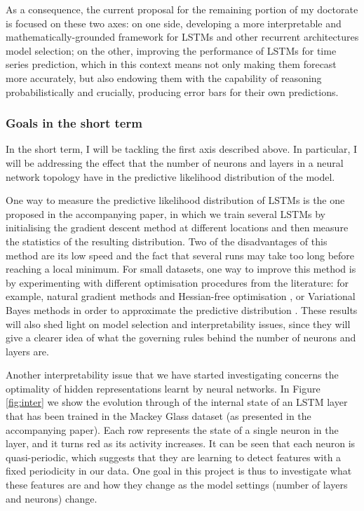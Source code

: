 \documentclass[pdftex,12pt,a4paper]{article}
\theoremstyle{definition}
\theoremstyle{remark}
\begin{document}
\par As a consequence, the current proposal for the remaining portion of my doctorate is focused on these two axes: on one side, developing a more interpretable and mathematically-grounded framework for LSTMs and other recurrent architectures model selection; on the other, improving the performance of LSTMs for time series prediction, which in this context means not only making them forecast more accurately, but also endowing them with the capability of reasoning probabilistically and crucially, producing error bars for their own predictions. 

\subsubsection{Goals in the short term}
In the short term, I will be tackling the first axis described above. In particular, I will be addressing the effect that the number of neurons and layers in a neural network topology have in the predictive likelihood distribution of the model. 

\par One way to measure the predictive likelihood distribution of LSTMs is the one proposed in the accompanying paper, in which we train several LSTMs by initialising the gradient descent method at different locations and then measure the statistics of the resulting distribution. Two of the disadvantages of this method are its low speed and the fact that several runs may take too long before reaching a local minimum. For small datasets, one way to improve this method is by experimenting with different optimisation procedures from the literature: for example, natural gradient methods \cite{Pascanu2014} and Hessian-free optimisation \cite{Martens2010}, or Variational Bayes methods in order to approximate the predictive distribution \cite{Snelson2005}. These results will also shed light on model selection and interpretability issues, since they will give a clearer idea of what the governing rules behind the number of neurons and layers are. 

\par Another interpretability issue that we have started investigating concerns the optimality of hidden representations learnt by neural networks. In Figure \ref{fig:inter} we show the evolution through of the internal state of an LSTM layer that has been trained in the Mackey Glass dataset (as presented in the accompanying paper). Each row represents the state of a single neuron in the layer, and it turns red as its activity increases. It can be seen that each neuron is quasi-periodic, which suggests that they are learning to detect features with a fixed periodicity in our data. One goal in this project is thus to investigate what these features are and how they change as the model settings (number of layers and neurons) change.
\end{document}
